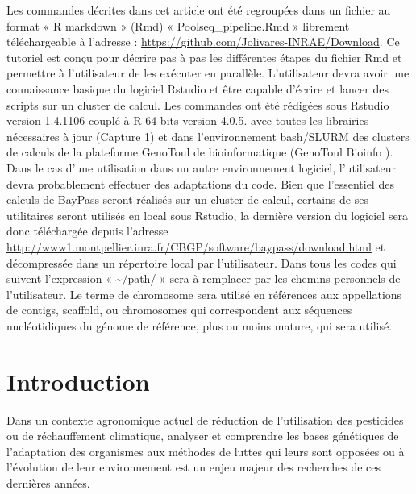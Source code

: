 \documentclass[
  openany]{book}
\begin{document}
Les commandes décrites dans cet article ont été regroupées dans un fichier au format « R markdown » (Rmd) « Poolseq\_pipeline.Rmd » librement téléchargeable à l'adresse : \url{https://github.com/Jolivares-INRAE/Download}. Ce tutoriel est conçu pour décrire pas à pas les différentes étapes du fichier Rmd et permettre à l'utilisateur de les exécuter en parallèle.
L'utilisateur devra avoir une connaissance basique du logiciel Rstudio et être capable d'écrire et lancer des scripts sur un cluster de calcul.
Les commandes ont été rédigées sous Rstudio version 1.4.1106 couplé à R 64 bits version 4.0.5. avec toutes les librairies nécessaires à jour (Capture 1) et dans l'environnement bash/SLURM des clusters de calculs de la plateforme GenoToul de bioinformatique (GenoToul Bioinfo ). Dans le cas d'une utilisation dans un autre environnement logiciel, l'utilisateur devra probablement effectuer des adaptations du code.
Bien que l'essentiel des calculs de BayPass seront réalisés sur un cluster de calcul, certains de ses utilitaires seront utilisés en local sous Rstudio, la dernière version du logiciel sera donc téléchargée depuis l'adresse \url{http://www1.montpellier.inra.fr/CBGP/software/baypass/download.html} et décompressée dans un répertoire local par l'utilisateur.
Dans tous les codes qui suivent l'expression « \textasciitilde/path/ » sera à remplacer par les chemins personnels de l'utilisateur.
Le terme de chromosome sera utilisé en références aux appellations de contigs, scaffold, ou chromosomes qui correspondent aux séquences nucléotidiques du génome de référence, plus ou moins mature, qui sera utilisé.

\hypertarget{introduction}{%
\chapter*{Introduction}\label{introduction}}

Dans un contexte agronomique actuel de réduction de l'utilisation des pesticides ou de réchauffement climatique, analyser et comprendre les bases génétiques de l'adaptation des organismes aux méthodes de luttes qui leurs sont opposées ou à l'évolution de leur environnement est un enjeu majeur des recherches de ces dernières années.
\end{document}
